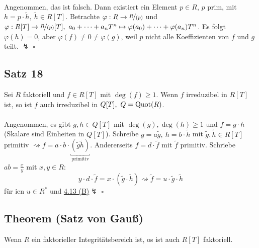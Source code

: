 \\
Angenommen, das ist falsch.
Dann existiert ein Element $p\in R$, $p$ prim, mit $h=p\cdot \tilde{h},~\tilde{h}\in R[T]$.
Betrachte $\varphi:R\to \nicefrac{R}{(p)}$  und $\varphi:R[T]\to \nicefrac{R}{(p)}[T],~ a_0+ \dots +a_nT^n\mapsto \varphi(a_0)+ \dots +\varphi(a_n)T^n$.
Es folgt $\varphi(h)=0$, aber $\varphi(f)\neq 0 \neq \varphi(g)$, weil $p$ \uline{nicht} alle Koeffizienten von $f$ und $g$ teilt. $\lightning$
\hfill $\square$

\subsection{Satz 18}
\label{sub:satz_18}
Sei $R$ faktoriell und $f\in R[T]$ mit $\deg(f)\ge 1$.
Wenn $f$ irreduzibel in $R[T]$ ist, so ist $f$ auch irreduzibel in $Q[T],~Q=\operatorname{Quot}(R)$.\\
\newpage
{}\\
Angenommen, es gibt $g,h\in Q[T]$ mit $\deg(g),\deg(h)\ge 1$ und $f=g\cdot h$ (Skalare sind Einheiten in $Q[T]$).
Schreibe $g=a\tilde{g},~h=b\cdot \tilde{h}$ mit $\tilde{g},\tilde{h}\in R[T]$ primitiv $\rightsquigarrow f=a\cdot b\cdot \underbracket{(\tilde{g}\tilde{h})}_{\text{primitiv}}$.
Andererseits $f=d\cdot \tilde{f}$ mit $\tilde{f}$ primitiv.
Schriebe $ab=\frac{x}{y}$ mit $x,y\in R$:
\[
y\cdot d\cdot \tilde{f}=x\cdot (\tilde{g}\cdot \tilde{h}) \rightsquigarrow \tilde{f}=u\cdot \tilde{g}\cdot
\tilde{h}
\]
für ien $u\in R^*$ und \hyperref[sub:vorbereitung_satz_von_gauss]{4.13 (B)}$\lightning$
\hfill $\square$

\subsection{Theorem (Satz von Gauß)}
\label{sub:satz_von_gauss}
Wenn $R$ ein faktorieller Integritätsbereich ist, os ist auch $R[T]$ faktoriell.\\

